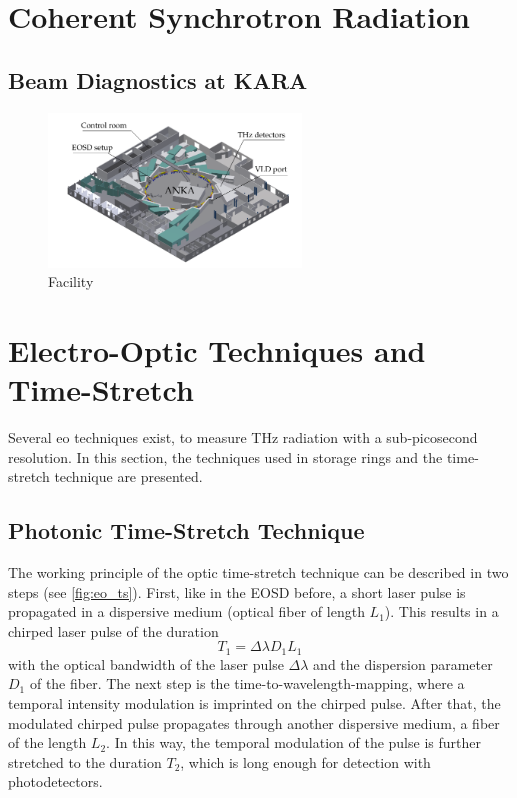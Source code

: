 \section{Coherent Synchrotron Radiation}
\subsection{Beam Diagnostics at KARA}

\begin{figure}[tbh]
	\centering
	\includegraphics[width = 0.6\textwidth]{chap/02-theory/img/kara.png}
	\caption{Facility \cite{rota2018}}
	\label{fig:kara}
\end{figure}

\newpage 
\section{Electro-Optic Techniques and Time-Stretch}
Several \gls{eo} techniques exist, to measure THz radiation with a sub-picosecond resolution.
In this section, the techniques used in storage rings and the time-stretch technique are presented. 



\subsection{Photonic Time-Stretch Technique}
The working principle of the optic time-stretch technique can be described in two steps (see \autoref{fig:eo_ts}).
First, like in the EOSD before, a short laser pulse is propagated in a dispersive medium (optical fiber of length $L_1$). %
This results in a chirped laser pulse of the duration
\begin{equation}
	T_1 = \Delta \lambda D_1 L_1
\end{equation}
with the optical bandwidth of the laser pulse $\Delta \lambda$  and the dispersion parameter $D_1$ of the fiber.
The next step is the time-to-wavelength-mapping, where a temporal intensity modulation is imprinted on the chirped pulse.
After that, the modulated chirped pulse propagates through another dispersive medium, a fiber of the length $L_2$.
In this way, the temporal modulation of the pulse is further stretched to the duration $T_2$, which is long enough for detection with photodetectors. \cite{roussel2014}

